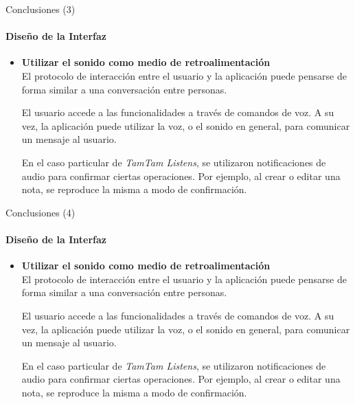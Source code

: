 \begin{frame}{Conclusiones (3)}
\framesubtitle{Dise\~no de la Interfaz}
\begin{itemize}

\item{\textbf{Utilizar el sonido como medio de retroalimentaci\'on\\}}
El protocolo de interacci\'on entre el usuario y la aplicaci\'on puede pensarse de forma similar a una 
conversaci\'on entre personas. 

El usuario accede a las funcionalidades a trav\'es de comandos de voz.
A su vez, la aplicaci\'on puede utilizar la voz, o el sonido en general, para comunicar un mensaje al usuario.

En el caso particular de \emph{TamTam Listens}, se utilizaron notificaciones de audio para confirmar
ciertas operaciones. Por ejemplo, al crear o editar una nota, se reproduce la misma a modo de
confirmaci\'on.
\end{itemize}
\end{frame}

\begin{frame}{Conclusiones (4)}
\framesubtitle{Dise\~no de la Interfaz}
\begin{itemize}
\item{\textbf{Utilizar el sonido como medio de retroalimentaci\'on\\}}
El protocolo de interacci\'on entre el usuario y la aplicaci\'on puede pensarse de forma similar a una 
conversaci\'on entre personas. 

El usuario accede a las funcionalidades a trav\'es de comandos de voz.
A su vez, la aplicaci\'on puede utilizar la voz, o el sonido en general, para comunicar un mensaje al usuario.

En el caso particular de \emph{TamTam Listens}, se utilizaron notificaciones de audio para confirmar
ciertas operaciones. Por ejemplo, al crear o editar una nota, se reproduce la misma a modo de
confirmaci\'on.
\end{itemize}
\end{frame}


